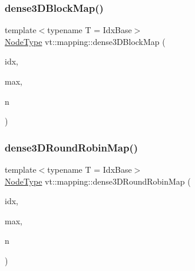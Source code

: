 \mbox{\label{namespacevt_1_1mapping_a91764d84e5e6d8253872740cb8424726}} 
\subsubsection{\texorpdfstring{dense3\+D\+Block\+Map()}{dense3DBlockMap()}}
{\footnotesize\ttfamily template$<$typename T  = Idx\+Base$>$ \\
\hyperlink{namespacevt_a866da9d0efc19c0a1ce79e9e492f47e2}{Node\+Type} vt\+::mapping\+::dense3\+D\+Block\+Map (\begin{DoxyParamCaption}\item[{\hyperlink{namespacevt_1_1mapping_aacc737158b6517f2d760ffc8d1b5abca}{Idx3\+D\+Ptr}$<$ T $>$}]{idx,  }\item[{\hyperlink{namespacevt_1_1mapping_aacc737158b6517f2d760ffc8d1b5abca}{Idx3\+D\+Ptr}$<$ T $>$}]{max,  }\item[{\hyperlink{namespacevt_a866da9d0efc19c0a1ce79e9e492f47e2}{Node\+Type}}]{n }\end{DoxyParamCaption})}

\mbox{\label{namespacevt_1_1mapping_aa48fa3b830b637787c584dbac5bba6db}} 
\subsubsection{\texorpdfstring{dense3\+D\+Round\+Robin\+Map()}{dense3DRoundRobinMap()}}
{\footnotesize\ttfamily template$<$typename T  = Idx\+Base$>$ \\
\hyperlink{namespacevt_a866da9d0efc19c0a1ce79e9e492f47e2}{Node\+Type} vt\+::mapping\+::dense3\+D\+Round\+Robin\+Map (\begin{DoxyParamCaption}\item[{\hyperlink{namespacevt_1_1mapping_aacc737158b6517f2d760ffc8d1b5abca}{Idx3\+D\+Ptr}$<$ T $>$}]{idx,  }\item[{\hyperlink{namespacevt_1_1mapping_aacc737158b6517f2d760ffc8d1b5abca}{Idx3\+D\+Ptr}$<$ T $>$}]{max,  }\item[{\hyperlink{namespacevt_a866da9d0efc19c0a1ce79e9e492f47e2}{Node\+Type}}]{n }\end{DoxyParamCaption})}

